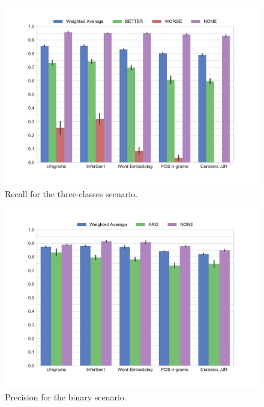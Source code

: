   \begin{figure}[p]
     \caption{Recall for the three-classes scenario.} 
       \label{fig:3_recall}
 \centering
	\includegraphics[width=1\textwidth]{images/experiments/recall-False}
\end{figure}



\begin{figure}[tb]
   \caption{Precision for the binary scenario.} 
    \label{fig:2_precision}
    \centering
	\includegraphics[width=0.9\linewidth]{images/experiments/precision-True}
    \end{figure}
    
